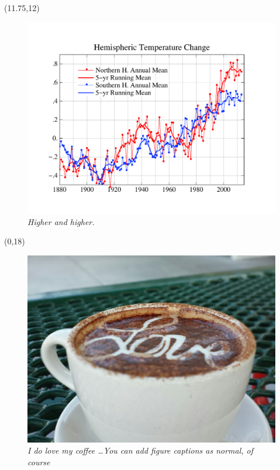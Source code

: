 \documentclass[lpsc]{lpscposter}
\begin{document}
\begin{textblock}{7}(11.75,12)
\begin{figure}
	\includegraphics[width=\textwidth]{FigA3.pdf}
	\caption{
	\scriptsize
	{\em Higher and higher.}
	\label{hot}
	}
\end{figure}
\end{textblock}


\begin{textblock}{7}(0,18)
\begin{center}
\begin{figure}
\includegraphics[width=\textwidth]{Coffee}
	\caption{
	\scriptsize
	{\em I do love my coffee \dots You can add figure captions as normal, of course}
	\label{Utah}
	}
\end{figure}
\end{center}
\end{textblock}
\end{document}
